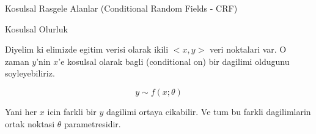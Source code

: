 \documentclass[12pt,fleqn]{article}\usepackage{../common}
\begin{document}
Kosulsal Rasgele Alanlar (Conditional Random Fields - CRF)

Kosulsal Olurluk

Diyelim ki elimizde egitim verisi olarak ikili $<x,y>$ veri noktalari
var. O zaman $y$'nin $x$'e kosulsal olarak bagli (conditional on) bir
dagilimi oldugunu soyleyebiliriz. 

$$ y \sim f(x;\theta) $$

Yani her $x$ icin farkli bir $y$ dagilimi ortaya cikabilir. Ve tum bu
farkli dagilimlarin ortak noktasi $\theta$ parametresidir.
\end{document}
